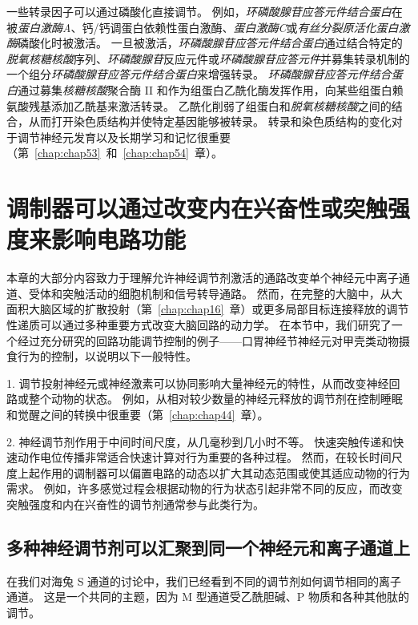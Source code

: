 一些转录因子可以通过磷酸化直接调节。
例如，\textit{环磷酸腺苷应答元件结合蛋白}在被\textit{蛋白激酶A}、钙/钙调蛋白依赖性蛋白激酶、\textit{蛋白激酶C}或\textit{有丝分裂原活化蛋白激酶}磷酸化时被激活。
一旦被激活，\textit{环磷酸腺苷应答元件结合蛋白}通过结合特定的\textit{脱氧核糖核酸}序列、\textit{环磷酸腺苷}反应元件或\textit{环磷酸腺苷应答元件}并募集转录机制的一个组分\textit{环磷酸腺苷应答元件结合蛋白}来增强转录。
\textit{环磷酸腺苷应答元件结合蛋白}通过募集\textit{核糖核酸}聚合酶 II 和作为组蛋白乙酰化酶发挥作用，向某些组蛋白赖氨酸残基添加乙酰基来激活转录。
乙酰化削弱了组蛋白和\textit{脱氧核糖核酸}之间的结合，从而打开染色质结构并使特定基因能够被转录。
转录和染色质结构的变化对于调节神经元发育以及长期学习和记忆很重要（第~\ref{chap:chap53}~和~\ref{chap:chap54}~章）。



\section{调制器可以通过改变内在兴奋性或突触强度来影响电路功能}

本章的大部分内容致力于理解允许神经调节剂激活的通路改变单个神经元中离子通道、受体和突触活动的细胞机制和信号转导通路。
然而，在完整的大脑中，从大面积大脑区域的扩散投射（第~\ref{chap:chap16}~章）或更多局部目标连接释放的调节性递质可以通过多种重要方式改变大脑回路的动力学。
在本节中，我们研究了一个经过充分研究的回路功能调节控制的例子——口胃神经节神经元对甲壳类动物摄食行为的控制，以说明以下一般特性。


1. 调节投射神经元或神经激素可以协同影响大量神经元的特性，从而改变神经回路或整个动物的状态。
例如，从相对较少数量的神经元释放的调节剂在控制睡眠和觉醒之间的转换中很重要（第~\ref{chap:chap44}~章）。


2. 神经调节剂作用于中间时间尺度，从几毫秒到几小时不等。
快速突触传递和快速动作电位传播非常适合快速计算对行为重要的各种过程。
然而，在较长时间尺度上起作用的调制器可以偏置电路的动态以扩大其动态范围或使其适应动物的行为需求。
例如，许多感觉过程会根据动物的行为状态引起非常不同的反应，而改变突触强度和内在兴奋性的调节剂通常参与此类行为。



\subsection{多种神经调节剂可以汇聚到同一个神经元和离子通道上}

在我们对海兔 S 通道的讨论中，我们已经看到不同的调节剂如何调节相同的离子通道。
这是一个共同的主题，因为 M 型通道受乙酰胆碱、P 物质和各种其他肽的调节。


